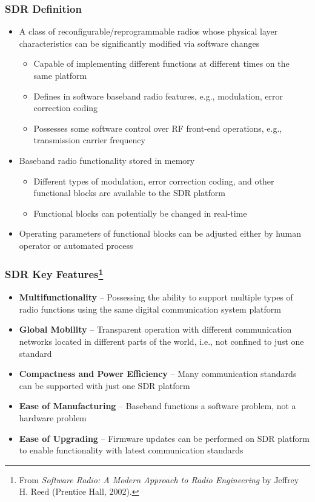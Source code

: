 \documentclass[10pt]{beamer}
\begin{document}
\frame
{
  \frametitle{SDR Definition}
  \begin{itemize}
    \item A class of reconfigurable/reprogrammable radios whose physical layer characteristics can be significantly modified via software changes
    \begin{itemize}
        \item Capable of implementing different functions at different times on the same platform
        \item Defines in software baseband radio features, e.g., modulation, error correction coding
        \item Possesses some software control over RF front-end operations, e.g., transmission carrier frequency
    \end{itemize}
    \item Baseband radio functionality stored in memory
    \begin{itemize}
        \item Different types of modulation, error correction coding, and other functional blocks are available to the SDR platform
        \item Functional blocks can potentially be changed in real-time
    \end{itemize}
    \item Operating parameters of functional blocks can be adjusted either by human operator or automated process
  \end{itemize}
}



\frame
{
  \frametitle{SDR Key Features\footnote{\tiny From {\it Software Radio: A Modern Approach to Radio Engineering} by Jeffrey H. Reed (Prentice Hall, 2002).}}
  \begin{itemize}
    \item {\bf Multifunctionality} -- Possessing the ability to support multiple types of radio functions using the same digital communication system platform
    \item {\bf Global Mobility} -- Transparent operation with different communication networks located in different parts of the world, i.e., not confined to just one standard
    \item {\bf Compactness and Power Efficiency} -- Many communication standards can be supported with just one SDR platform
    \item {\bf Ease of Manufacturing} -- Baseband functions a software problem, not a hardware problem
    \item {\bf Ease of Upgrading} -- Firmware updates can be performed on SDR platform to enable functionality with latest communication standards
  \end{itemize}
}
\end{document}
